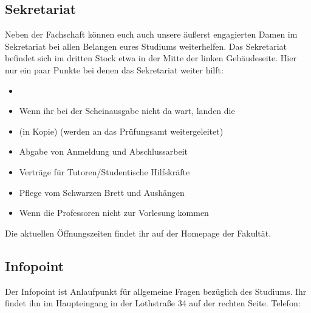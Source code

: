 \subsection{Sekretariat}
Neben der Fachschaft können euch auch unsere äußerst engagierten 
Damen im Sekretariat bei allen Belangen eures Studiums weiterhelfen. 
Das Sekretariat befindet sich im dritten Stock etwa in der Mitte der 
linken Gebäudeseite.\doublebreak
Hier nur ein paar Punkte bei denen das Sekretariat weiter hilft:
\begin{itemize}
	\item {} 
	\item Wenn ihr bei der Scheinausgabe nicht da wart, landen die 	
	\item {} (in Kopie) (werden an das Prüfungsamt weitergeleitet) 
	\item Abgabe von Anmeldung und Abschlussarbeit 
	\item Verträge für Tutoren/Studentische Hilfskräfte 
	\item Pflege vom Schwarzen Brett und Aushängen 
	\item Wenn die Professoren nicht zur Vorlesung kommen
\end{itemize}
Die aktuellen Öffnungszeiten findet ihr auf der Homepage der Fakultät. 

\subsection{Infopoint}
Der Infopoint ist Anlaufpunkt für allgemeine Fragen bezüglich des 
Studiums. Ihr findet ihn im Haupteingang in der Lothstraße 34 auf der 
rechten Seite. Telefon: 